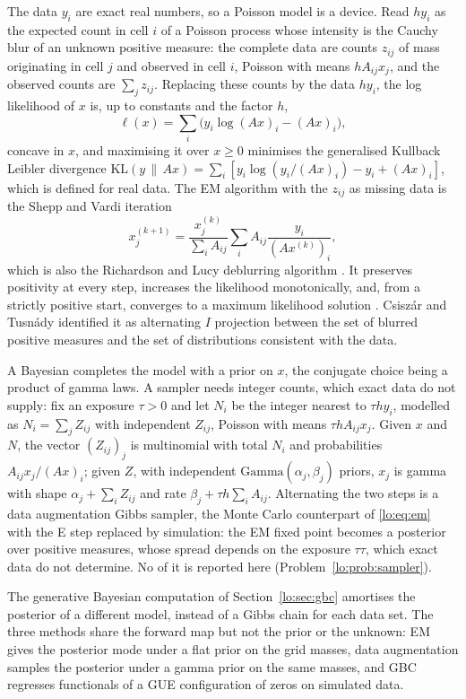 The data $y_i$ are exact real numbers, so a Poisson model is a device. Read $hy_i$ as the expected count in cell $i$ of a Poisson process whose intensity is the Cauchy blur of an unknown positive measure: the complete data are counts $z_{ij}$ of mass originating in cell $j$ and observed in cell $i$, Poisson with means $hA_{ij}x_j$, and the observed counts are $\sum_jz_{ij}$. Replacing these counts by the data $hy_i$, the log likelihood of $x$ is, up to constants and the factor $h$,
\[
\ell(x)=\sum_i\bigl(y_i\log(Ax)_i-(Ax)_i\bigr),
\]
concave in $x$, and maximising it over $x\ge0$ minimises the generalised Kullback Leibler divergence $\mathrm{KL}(y\,\|\,Ax)=\sum_i[y_i\log(y_i/(Ax)_i)-y_i+(Ax)_i]$, which is defined for real data. The EM algorithm with the $z_{ij}$ as missing data is the Shepp and Vardi iteration \cite{ShVa82}
\begin{equation}\label{lo:eq:em}
x_j^{(k+1)}=\frac{x_j^{(k)}}{\sum_iA_{ij}}\sum_iA_{ij}\frac{y_i}{(Ax^{(k)})_i},
\end{equation}
which is also the Richardson and Lucy deblurring algorithm \cite{Richardson72,Lucy74}. It preserves positivity at every step, increases the likelihood monotonically, and, from a strictly positive start, converges to a maximum likelihood solution \cite{VSK85}. Csisz\'ar and Tusn\'ady \cite{CT84} identified it as alternating $I$ projection between the set of blurred positive measures and the set of distributions consistent with the data.

A Bayesian completes the model with a prior on $x$, the conjugate choice being a product of gamma laws. A sampler needs integer counts, which exact data do not supply: fix an exposure $\tau>0$ and let $N_i$ be the integer nearest to $\tau hy_i$, modelled as $N_i=\sum_jZ_{ij}$ with independent $Z_{ij}$, Poisson with means $\tau hA_{ij}x_j$. Given $x$ and $N$, the vector $(Z_{ij})_j$ is multinomial with total $N_i$ and probabilities $A_{ij}x_j/(Ax)_i$; given $Z$, with independent $\mathrm{Gamma}(\alpha_j,\beta_j)$ priors, $x_j$ is gamma with shape $\alpha_j+\sum_iZ_{ij}$ and rate $\beta_j+\tau h\sum_iA_{ij}$. Alternating the two steps is a data augmentation Gibbs sampler, the Monte Carlo counterpart of \eqref{lo:eq:em} with the E step replaced by simulation: the EM fixed point becomes a posterior over positive measures, whose spread depends on the exposure $\tau$$\tau$, which exact data do not determine. No of it is reported here (Problem~\ref{lo:prob:sampler}).

The generative Bayesian computation of Section~\ref{lo:sec:gbc} amortises the posterior of a different model, instead of a Gibbs chain for each data set. The three methods share the forward map but not the prior or the unknown: EM gives the posterior mode under a flat prior on the grid masses, data augmentation samples the posterior under a gamma prior on the same masses, and GBC regresses functionals of a GUE configuration of zeros on simulated data.

